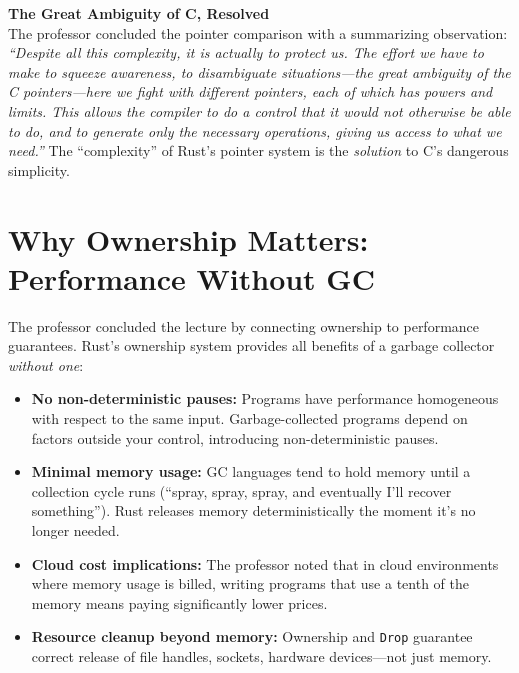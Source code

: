 \begin{insightbox}
\textbf{The Great Ambiguity of C, Resolved} \\
The professor concluded the pointer comparison with a summarizing observation: \emph{``Despite all this complexity, it is actually to protect us. The effort we have to make to squeeze awareness, to disambiguate situations---the great ambiguity of the C pointers---here we fight with different pointers, each of which has powers and limits. This allows the compiler to do a control that it would not otherwise be able to do, and to generate only the necessary operations, giving us access to what we need.''} The ``complexity'' of Rust's pointer system is the \emph{solution} to C's dangerous simplicity.
\end{insightbox}

\section{Why Ownership Matters: Performance Without GC}

The professor concluded the lecture by connecting ownership to performance guarantees. Rust's ownership system provides all benefits of a garbage collector \emph{without one}:

\begin{itemize}
    \item \textbf{No non-deterministic pauses:} Programs have performance homogeneous with respect to the same input. Garbage-collected programs depend on factors outside your control, introducing non-deterministic pauses.
    \item \textbf{Minimal memory usage:} GC languages tend to hold memory until a collection cycle runs (``spray, spray, spray, and eventually I'll recover something''). Rust releases memory deterministically the moment it's no longer needed.
    \item \textbf{Cloud cost implications:} The professor noted that in cloud environments where memory usage is billed, writing programs that use a tenth of the memory means paying significantly lower prices.
    \item \textbf{Resource cleanup beyond memory:} Ownership and \texttt{Drop} guarantee correct release of file handles, sockets, hardware devices---not just memory.
\end{itemize}


